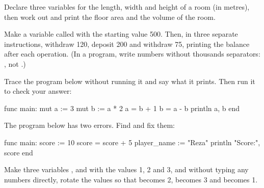 \exercise Declare three variables for the length, width and height of a room
(in metres), then work out and print the floor area and the volume of the
room.

\exercise Make a variable called  with the starting value
500. Then, in three separate instructions, withdraw 120, deposit 200 and
withdraw 75, printing the balance after each operation. (In a program, write
numbers without thousands separators: , not
.)

\exercise Trace the program below without running it and say what it
prints. Then run it to check your answer:
\begin{salamcode}
func main:
    mut a := 3
    mut b := a * 2
    a = b + 1
    b = a - b
    println a, b
end
\end{salamcode}

\exercise The program below has two errors. Find and fix them:
\begin{salamcode}
func main:
    score := 10
    score = score + 5
    player_name := "Reza"
    println "Score:", score
end
\end{salamcode}

\exercise Make three variables ,  and
 with the values 1, 2 and 3, and without typing any numbers
directly, rotate the values so that  becomes 2, 
becomes 3 and  becomes 1.
